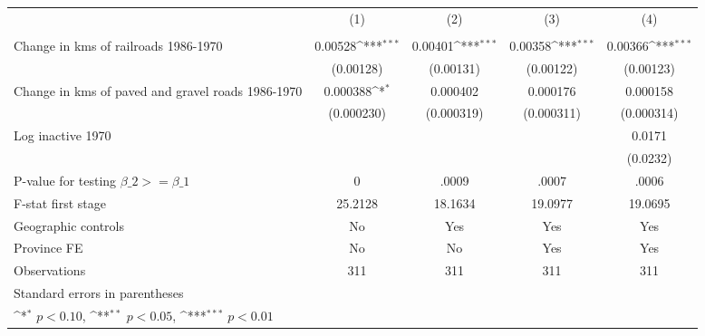 {
\def\sym#1{\ifmmode^{#1}\else\(^{#1}\)\fi}
\begin{tabular}{l*{4}{c}}
\hline\hline
                &\multicolumn{1}{c}{(1)}&\multicolumn{1}{c}{(2)}&\multicolumn{1}{c}{(3)}&\multicolumn{1}{c}{(4)}\\
                &\multicolumn{1}{c}{}&\multicolumn{1}{c}{}&\multicolumn{1}{c}{}&\multicolumn{1}{c}{}\\
\hline
Change in kms of railroads 1986-1970&  0.00528\sym{***}&  0.00401\sym{***}&  0.00358\sym{***}&  0.00366\sym{***}\\
                &(0.00128)         &(0.00131)         &(0.00122)         &(0.00123)         \\
[1em]
Change in kms of paved and gravel roads 1986-1970& 0.000388\sym{*}  & 0.000402         & 0.000176         & 0.000158         \\
                &(0.000230)         &(0.000319)         &(0.000311)         &(0.000314)         \\
[1em]
Log inactive 1970&                  &                  &                  &   0.0171         \\
                &                  &                  &                  & (0.0232)         \\
\hline
P-value for testing $\beta\_{2} >= \beta\_{1}$&        0         &    .0009         &    .0007         &    .0006         \\
F-stat first stage&  25.2128         &  18.1634         &  19.0977         &  19.0695         \\
Geographic controls&       No         &      Yes         &      Yes         &      Yes         \\
Province FE     &       No         &       No         &      Yes         &      Yes         \\
Observations    &      311         &      311         &      311         &      311         \\
\hline\hline
\multicolumn{5}{l}{\footnotesize Standard errors in parentheses}\\
\multicolumn{5}{l}{\footnotesize \sym{*} \(p<0.10\), \sym{**} \(p<0.05\), \sym{***} \(p<0.01\)}\\
\end{tabular}
}
